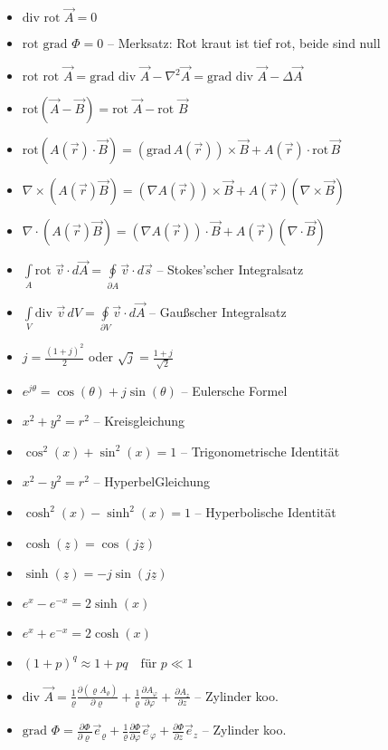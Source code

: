 \begin{itemize}
\item $\text{div rot } \vec{A} = 0$
\item $\text{rot grad } \Phi = 0$ -- Merksatz: Rot kraut ist tief rot, beide sind null
\item $\text{rot rot } \vec{A} = \text{grad div } \vec{A} - \nabla^2 \vec{A} = \text{grad div } \vec{A} - \Delta \vec{A}$
\item $\text{rot}(\vec{A} - \vec{B}) = \text{rot } \vec{A} - \text{rot } \vec{B}$
\item $\text{rot}(A(\vec{r}) \cdot \vec{B}) = (\text{grad}\,A(\vec{r})) \times \vec{B} + A(\vec{r}) \cdot \text{rot}\,\vec{B}$
\item $\nabla \times (A(\vec{r}) \vec{B}) = (\nabla A(\vec{r})) \times \vec{B} + A(\vec{r}) (\nabla \times \vec{B})$
\item $\nabla \cdot (A(\vec{r}) \vec{B}) = (\nabla A(\vec{r})) \cdot \vec{B}   + A(\vec{r}) (\nabla \cdot \vec{B})$
\item $\int\limits_A \text{rot } \vec{v} \cdot d\vec{A} = \oint\limits_{\partial A} \vec{v} \cdot d\vec{s}$ -- Stokes'scher Integralsatz
\item $\int\limits_V \text{div } \vec{v} \, dV = \oint\limits_{\partial V} \vec{v} \cdot d\vec{A}$ -- Gaußscher Integralsatz
\item $j = \frac{(1+j)^2}{2}$ oder $\sqrt{j} = \frac{1+j}{\sqrt{2}}$
\item $e^{j\theta} = \cos(\theta) + j \sin(\theta)$ -- Eulersche Formel
\item $x^2 + y^2 = r^2$ -- Kreisgleichung
\item $\cos^2(x) + \sin^2(x) = 1$ -- Trigonometrische Identität
\item $x^2 - y^2 = r^2$ -- HyperbelGleichung
\item $\cosh^2(x) - \sinh^2(x) = 1$ -- Hyperbolische Identität
\item $\cosh(\underline{z}) = \cos(j\underline{z})$
\item $\sinh(\underline{z}) = -j\sin(j\underline{z})$
\item $e^x - e^{-x} = 2\sinh(x)$
\item $e^x + e^{-x} = 2\cosh(x)$
\item $(1 + p)^q \approx 1 + pq \quad \text{für } p \ll 1$




\item $\text{div } \vec{A} = \frac{1}{\varrho} \frac{\partial(\varrho A_\varrho)}{\partial \varrho} + \frac{1}{\varrho} \frac{\partial A_\varphi}{\partial \varphi} + \frac{\partial A_z}{\partial z}$ -- Zylinder koo.
\item $\text{grad } \Phi = \frac{\partial \Phi}{\partial \varrho} \vec{e}_\varrho + \frac{1}{\varrho} \frac{\partial \Phi}{\partial \varphi} \vec{e}_\varphi + \frac{\partial \Phi}{\partial z} \vec{e}_z$ -- Zylinder koo.


\end{itemize}
